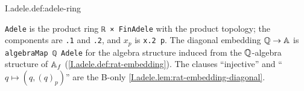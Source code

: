 \begin{definition}[adeles]
\end{definition}
\begin{tfformal}{I.adele.def:adele-ring}
\begin{tffidelity}
\texttt{Adele} is the product ring \texttt{ℝ × FinAdele} with the product topology; the components are \texttt{.1} and \texttt{.2}, and $x_p$ is \texttt{x.2 p}. The diagonal embedding $\mathbb{Q}\to\mathbb{A}$ is \texttt{algebraMap ℚ Adele} for the algebra structure induced from the $\mathbb{Q}$-algebra structure of $\mathbb{A}_f$ (\cref{I.adele.def:rat-embedding}). The clauses ``injective'' and ``$q\mapsto(q,(q)_p)$'' are the B-only \cref{I.adele.lem:rat-embedding-diagonal}.
\end{tffidelity}
\end{tfformal}

